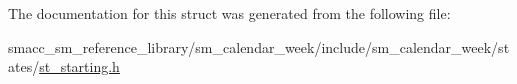 The documentation for this struct was generated from the following file\+:\begin{DoxyCompactItemize}
\item 
smacc\+\_\+sm\+\_\+reference\+\_\+library/sm\+\_\+calendar\+\_\+week/include/sm\+\_\+calendar\+\_\+week/states/\hyperlink{sm__calendar__week_2include_2sm__calendar__week_2states_2st__starting_8h}{st\+\_\+starting.\+h}\end{DoxyCompactItemize}
